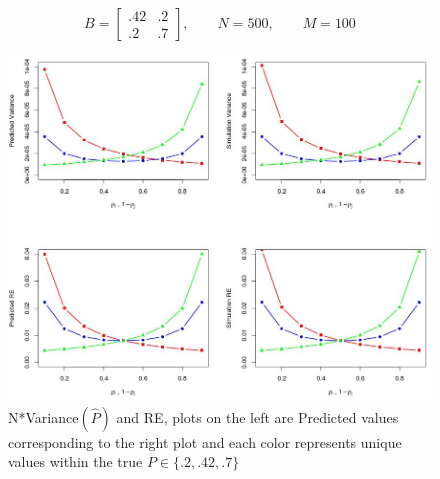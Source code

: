 		\begin{equation*}
		B = \begin{bmatrix}
		.42 & .2 \\
		.2 & .7 
		\end{bmatrix}
		,\qquad N = 500,\qquad M = 100
		\end{equation*}
	
	\begin{figure}[!htb]
		\centering
		\includegraphics[width=16cm]{PI.JPG}
		\caption{N*Variance$(\hat{P})$ and RE, plots on the left are Predicted values corresponding to the right plot and each color represents unique values within the true $P \in \{.2,.42,.7\}$ }
		\label{fig:plot1}
	\end{figure}
	\newpage
